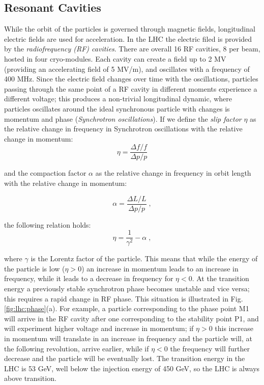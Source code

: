 \subsection{Resonant Cavities}

While the orbit of the particles is governed through magnetic fields, longitudinal electric fields are used for acceleration. In the LHC the electric filed is provided by the \textit{radiofrequency (RF) cavities}. There are overall 16 RF cavities, 8 per beam, hosted in four cryo-modules. Each cavity can create a field up to 2 MV (providing an accelerating field of 5 MV/m), and oscillates with a frequency of 400 MHz. Since the electric field changes over time with the oscillations, particles passing through the same point of a RF cavity in different moments experience a different voltage; this produces a non-trivial longitudinal dynamic, where particles oscillates around the ideal synchronous particle with changes is momentum and phase (\textit{Synchrotron oscillations}). If we define the \textit{slip factor} $\eta$ as the relative change in frequency in Synchrotron oscillations with the relative change in momentum:
\begin{equation}
\eta = \frac{\Delta f / f}{\Delta p / p}
\end{equation}

and the compaction factor $\alpha$ as the relative change in frequency in orbit length with the relative change in momentum:

\begin{equation}
\alpha = \frac{\Delta L / L}{\Delta p / p} \; ,
\end{equation}

the following relation holds:
\begin{equation}
\eta = \frac{1}{\gamma^2} - \alpha \; ,
\end{equation}

where $\gamma$ is the Lorentz factor of the particle. This means that while the energy of the particle is low ($\eta>0$) an increase in momentum leads to an increase in frequency, while it leads to a decrease in frequency for $\eta<0$. At the transition energy a previously stable synchrotron phase becomes unstable and vice versa; this requires a rapid change in RF phase. This situation is illustrated in Fig. \ref{fig:lhc:phase}(a). For example, a particle corresponding to the phase point M1 will arrive in the RF cavity after one corresponding to the stability point P1, and will experiment higher voltage and increase in momentum; if $\eta>0$ this increase in momentum will translate in an increase in frequency and the particle will, at the following revolution, arrive earlier, while if $\eta<0$ the frequency will further decrease and the particle will be eventually lost.  The transition energy in the LHC is 53 GeV, well below the injection energy of 450 GeV, so the LHC is always above transition. 

